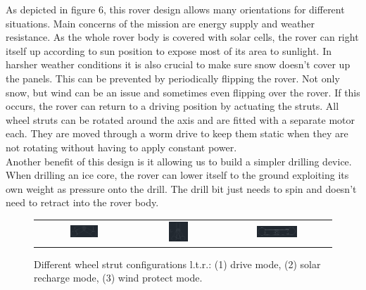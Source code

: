 \documentclass[a4paper,12pt]{article}
\begin{document}
As depicted in figure 6, this rover design allows many orientations for different situations. Main concerns of the mission are energy supply and weather resistance. As the whole rover body is covered with solar cells, the rover can right itself up according to sun position to expose most of its area to sunlight. In harsher weather conditions it is also crucial to make sure snow doesn't cover up the panels. This can be prevented by periodically flipping the rover. Not only snow, but wind can be an issue and sometimes even flipping over the rover. If this occurs, the rover can return to a driving position by actuating the struts. All wheel struts can be rotated around the axis and are fitted with a separate motor each. They are moved through a worm drive to keep them static when they are not rotating without having to apply constant power. \\
Another benefit of this design is it allowing us to build a simpler drilling device. When drilling an ice core, the rover can lower itself to the ground exploiting its own weight as pressure onto the drill. The drill bit just needs to spin and doesn't need to retract into the rover body.

\begin{figure}[h!]
\centering
\begin{tabular}{ c  c  c }
\includegraphics[width=0.3\textwidth]{drive} & \includegraphics[width=0.25\textwidth]{upright} & \includegraphics[width=0.4\textwidth]{flat} \\
\end{tabular}
\caption{Different wheel strut configurations l.t.r.: (1) drive mode, (2) solar recharge mode, (3) wind protect mode.}
\end{figure}
\end{document}
